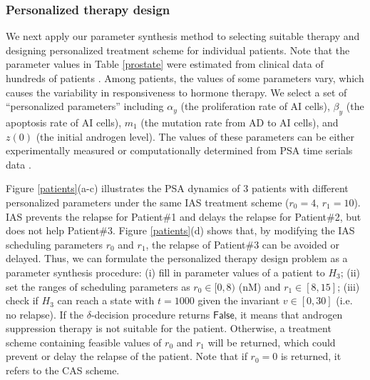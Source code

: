 \subsubsection{Personalized therapy design}
We next apply our parameter synthesis method to selecting suitable therapy and designing personalized treatment scheme for individual patients. Note that the parameter values in Table \ref{prostate} were estimated from clinical data of hundreds of patients \citep{bruchovsky07}. Among patients, the values of some parameters vary, which causes the variability in responsiveness to hormone therapy. We select a set of ``personalized parameters'' including $\alpha_y$ (the proliferation rate of AI cells), $\beta_y$ (the apoptosis rate of AI cells), $m_1$ (the mutation rate from AD to AI cells), and $z(0)$ (the initial androgen level). The values of these parameters can be either experimentally measured \citep{berges95} or computationally determined from PSA time serials data \citep{hirata10}.

Figure \ref{patients}(a-c) illustrates the PSA dynamics of $3$ patients with different personalized parameters under the same IAS treatment scheme ($r_0=4$, $r_1=10$). IAS prevents the relapse for Patient\#1 and delays the relapse for Patient\#2, but does not help Patient\#3. Figure \ref{patients}(d) shows that, by modifying the IAS scheduling parameters $r_0$ and $r_1$, the relapse of Patient\#3 can be avoided or delayed. Thus, we can formulate the personalized therapy design problem as a parameter synthesis procedure: (i) fill in parameter values of a patient to $H_3$; (ii) set the ranges of scheduling parameters as $r_0 \in [0,8)$ (nM) and $r_1 \in [8,15]$; (iii) check if $H_3$ can reach a state with $t=1000$ given the invariant $v \in [0,30]$ (i.e. no relapse). If the $\delta$-decision procedure returns $\mathsf{False}$, it means that androgen suppression therapy is not suitable for the patient. Otherwise, a treatment scheme containing feasible values of $r_0$ and $r_1$ will be returned, which could prevent or delay the relapse of the patient. Note that if $r_0=0$ is returned, it refers to the CAS scheme.

